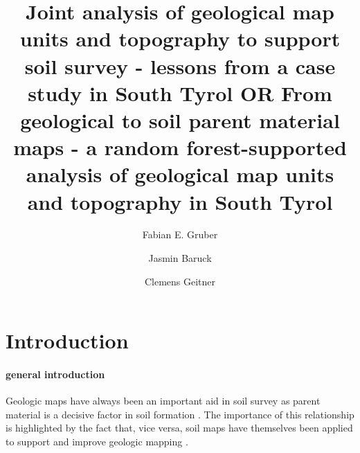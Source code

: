 \documentclass[preprint,12pt,authoryear]{elsarticle}
\begin{document}
\begin{frontmatter}

\title{Joint analysis of geological map units and topography to support soil survey - lessons from a case study in South Tyrol OR From geological to soil parent material maps - a random forest-supported  analysis of geological map units and topography in South Tyrol}



\author[mymainadress]{Fabian E. Gruber}
\author[mymainadress]{Jasmin Baruck}
\author[mymainadress]{Clemens Geitner}



\address[mymainadress]{Institute of Geography, University of Innsbruck, Innrain 52f, 6020 Innsbruck, Austria}

\begin{abstract}

\end{abstract}

\begin{keyword}

\end{keyword}

\end{frontmatter}

\linenumbers

\section{Introduction}
\paragraph{general introduction}
Geologic maps have always been an important aid in soil survey as parent material is a decisive factor in soil formation \citep{Jenny1941}. The importance of this relationship is highlighted by the fact that, vice versa, soil maps have themselves been applied to support and improve geologic mapping \citep{Brevik2015}. 
\end{document}
